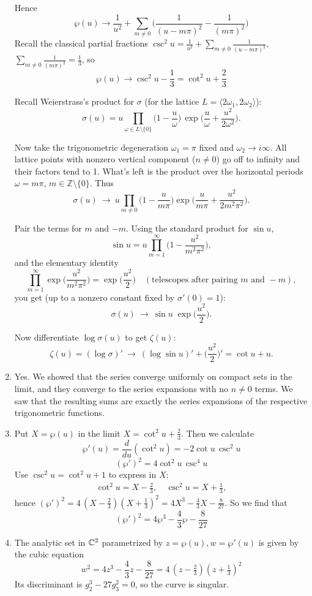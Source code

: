 \documentclass[12pt]{article}  %
\begin{document}
\begin{solution}
\begin{enumerate}
Hence
  \[\wp(u)\longrightarrow
  \frac1{u^2}+\sum_{m\ne0}\Big(\frac{1}{(u-m\pi)^2}-\frac1{(m\pi)^2}\Big)\]
  Recall the classical partial fractions
  $\csc^2 u=\frac1{u^2}+\sum_{m\ne0}\frac{1}{(u-m\pi)^2}$, 
  $\sum_{m\ne0}\frac1{(m\pi)^2}=\frac13$,
  so \[\wp(u) \longrightarrow \csc^2 u-\frac13 = \cot^2 u+\frac23\]

  Recall Weierstrass's product for $\sigma$ (for the lattice $L=\langle 2\omega_1,2\omega_2\rangle$):
  \[
  \sigma(u)
  =u\prod_{\omega\in L\setminus\{0\}}
  \Big(1-\frac{u}{\omega}\Big)\,
  \exp\!\Big(\frac{u}{\omega}+\frac{u^2}{2\omega^2}\Big).
  \]

  Now take the trigonometric degeneration $\omega_1=\pi$ fixed and $\omega_2\to i\infty$. All lattice points with nonzero vertical component ($n\neq 0$) go off to infinity and their factors tend to 1. What's left is the product over the horizontal periods $\omega=m\pi$, $m\in\mathbb Z\setminus\{0\}$. Thus
  \[
  \sigma(u)\ \longrightarrow\
  u\prod_{m\neq 0}\Big(1-\frac{u}{m\pi}\Big)
  \exp\!\Big(\frac{u}{m\pi}+\frac{u^2}{2m^2\pi^2}\Big).
  \]

  Pair the terms for $m$ and $-m$. Using the standard product for $\sin u$,
  \[
  \sin u
  = u\prod_{m=1}^\infty\Big(1-\frac{u^2}{m^2\pi^2}\Big),
  \]
  and the elementary identity
  \[
  \prod_{m=1}^\infty
  \exp\!\Big(\frac{u^2}{m^2\pi^2}\Big)
  =\exp\!\Big(\frac{u^2}{2}\Big)
  \quad(\text{telescopes after pairing }m\text{ and }-m),
  \]
  you get (up to a nonzero constant fixed by $\sigma'(0)=1$):
  \[
  \sigma(u)\ \longrightarrow\ \sin u\;\exp\!\Big(\frac{u^2}{2}\Big).
  \]

  Now differentiate   $\log\sigma(u)$ to get $\zeta(u)$:
  \[
  \zeta(u)=(\log\sigma)' \ \longrightarrow\
  (\log\sin u)' + \Big(\frac{u^2}{2}\Big)'
  = \cot u + u.
  \]

    \item Yes. We showed that the series converge uniformly on compact sets in the limit, and they converge to the series expansions with no $n\neq 0$ terms. We saw that the resulting sums are exactly the series expansions of the respective trigonometric functions.

 \item Put $X=\wp(u)$ in the limit $X=\cot^2 u+\tfrac23$.
  Then we calculate 
  \[\wp'(u)=\frac{d}{du}(\cot^2 u)= -2\cot u\,\csc^2 u\]
  \[(\wp')^2=4\cot^2 u\,\csc^4 u\]
  Use $\csc^2 u=\cot^2 u+1$ to express in $X$:
  \begin{align*}
    \cot^2 u=X-\tfrac23, \quad \csc^2 u=X+\tfrac13,
  \end{align*}
  hence
  $(\wp')^2=4\,(X-\tfrac23)(X+\tfrac13)^2
  =4X^3-\frac{4}{3}X-\frac{8}{27}$.
  So we find that
  \[(\wp')^2=4\wp^3-\frac{4}{3}\wp-\frac{8}{27}\]
\item The analytic set in $\mathbb{C}^2$ parametrized by $z=\wp(u), w=\wp'(u)$ is given by the cubic equation
  \[w^2=4z^3-\frac{4}{3}z-\frac{8}{27}
  =4\,(z-\tfrac{2}{3})(z+\tfrac{1}{3})^2\]
  Its discriminant is $g_2^3-27g_3^2=0$, so the curve is singular.
  \end{enumerate}
\end{solution}
\end{document}

